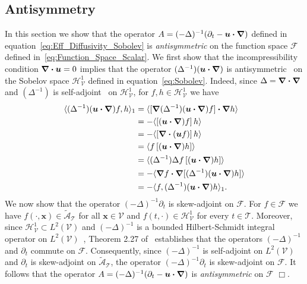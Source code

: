 \documentclass[leqno,onefignum,onetabnum]{siamltex1213}
\newcommand{\Tc}{\mathcal{T}}
\newcommand{\Vc}{\mathcal{V}}
\newcommand{\Hs}{\mathscr{H}}
\newcommand{\As}{\mathscr{A}}
\newcommand{\Fs}{\mathscr{F}}
\newcommand\bnabla{\mbox{\boldmath${\nabla}$}}
\providecommand\bcdot{\boldsymbol{\cdot}}
\newcommand{\vecx}{\boldsymbol{x}}
\newcommand{\vecu}{\boldsymbol{u}}
\begin{document}
\subsection{Antisymmetry}\label{sec:Antisymmetry}
%
In this section we show that the operator
$A=(-\Delta)^{-1}(\partial_t-\vecu\bcdot\bnabla)$ defined
in equation~\eqref{eq:Eff_Diffusivity_Sobolev} is \emph{antisymmetric} on
the function space $\Fs$ defined
in~\eqref{eq:Function_Space_Scalar}. We first show that the
incompressibility condition $\bnabla\bcdot\vecu=0$ implies that the
operator $(\Delta^{-1})(\vecu\bcdot\bnabla )$ is 
antisymmetric~\cite{Bhattacharya:AAP:1999:951} on the Sobelov space
$\Hs^1_{\Vc}$ defined in equation~\eqref{eq:Sobolev}. Indeed, since 
$\Delta=\bnabla\bcdot\bnabla$ and $(\Delta^{-1})$ is
self-adjoint~\cite{Stakgold:BVP:2000} on $\Hs^1_{\Vc}$, for
$f,h\in\Hs^1_{\Vc}$ we have   
%
\begin{align}%
  \langle(\Delta^{-1})(\vecu \bcdot\bnabla )f,h\rangle_1
                            &=\langle[\bnabla (\Delta^{-1})(\vecu \bcdot\bnabla )f]\bcdot\bnabla h\rangle
                                 \\                              
                              &=-\langle[(\vecu \bcdot\bnabla )f]\,h\rangle
                                 \notag\\
                               &=-\langle[\bnabla \bcdot(\vecu f)]\,h\rangle
                                 \notag\\     
                              &=\langle f\,[(\vecu \bcdot\bnabla )h]\rangle
                                \notag\\
                              &=\langle(\Delta^{-1})\Delta f\,[(\vecu \bcdot\bnabla )h]\rangle
                                \notag\\
                              &=-\langle\bnabla f\bcdot\bnabla[(\Delta^{-1})(\vecu \bcdot\bnabla )h]\rangle
                                \notag\\                              
                              &=-\langle f,(\Delta^{-1})(\vecu \bcdot\bnabla )h\rangle_1.
                              \notag
\end{align}
%
We now show that the operator $(-\Delta)^{-1}\partial_t$ is skew-adjoint on
$\Fs$. For $f\in\Fs$ we have $f(\cdot,\vecx)\in\tilde{\As}_{\Tc}$ for all
$\vecx\in\Vc$ and $f(t,\cdot)\in\Hs^1_{\Vc}$ for every $t\in\Tc$. Moreover,
since $\Hs^1_{\Vc}\subset L^2(\Vc)$ and $(-\Delta)^{-1}$ is a bounded
Hilbert-Schmidt integral operator on $L^2(\Vc)$~\cite{Stakgold:BVP:2000},
Theorem 2.27 of~\cite{Folland:99:RealAnalysis} establishes that the operators
$(-\Delta)^{-1}$ and $\partial_t$ commute on $\Fs$. Consequently, since
$(-\Delta)^{-1}$ is self-adjoint on $L^2(\Vc)$ and $\partial_t$ is skew-adjoint on
$\tilde{\As}_{\Tc}$, the operator $(-\Delta)^{-1}\partial_t$ is skew-adjoint on
$\Fs$. It follows that the operator
$A=(-\Delta)^{-1}(\partial_t-\vecu\bcdot\bnabla)$ is \emph{antisymmetric} on
$\Fs$ $\Box$.  
\end{document}

